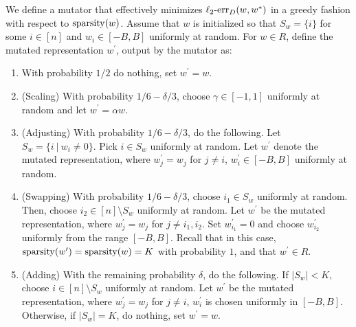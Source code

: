 We define a mutator that effectively minimizes $\mathrm{\ell_2\mbox{-}err}_D(w, w^*)$ in a greedy
fashion with respect to $\mathrm{sparsity}(w)$.
Assume that $w$ is initialized so that $S_w = \{i\}$ for some $i \in [n]$ and
$w_i \in [-B, B]$ uniformly at random.
For $w \in R$, define the mutated representation $w^\prime$, output by the mutator as:
\begin{enumerate}
\item With probability $1/2$ do nothing, set $w^\prime = w$.
\item (Scaling) With probability $1/6 - \delta/3$, choose $\gamma \in [-1, 1]$ uniformly at random and
let $w^\prime = \alpha w$. 
\item (Adjusting) With probability $1/6 - \delta/3$, do the following. Let $S_w = \{ i~|~ w_i \neq 0
\}$. Pick $i \in S_w$ uniformly at random. Let $w^\prime$ denote the
mutated representation, where $w^\prime_j = w_j$ for $j \neq i$, $w^\prime_i \in
[-B, B]$ uniformly at random. 
\item (Swapping) With probability $1/6 - \delta/3$, choose $i_1 \in S_w$ uniformly at random. Then, choose
$i_2 \in [n] \setminus S_w$ uniformly at random. Let $w^\prime$ be the mutated
representation, where $w_j^\prime = w_j$ for $j \neq i_1, i_2$. Set
$w_{i_1}^\prime = 0$ and choose $w_{i_2}^\prime$ uniformly from the range $[-B,
B]$. Recall that in this case, $\mathrm{sparsity}(w^\prime) = \mathrm{sparsity}(w) = K$ with
probability $1$, and that $w^\prime \in R$.
\item (Adding) With the remaining probability $\delta$, do the following.
If $|S_w| < K$, choose $i \in [n] \setminus S_w$ uniformly at random. Let
$w^\prime$ be the mutated representation, where $w_j^\prime = w_j$ for $j \neq
i$, $w^\prime_i$ is chosen uniformly in $[-B, B]$. 
Otherwise, if $|S_w| = K$, do nothing, set $w^\prime = w$.
\end{enumerate}
